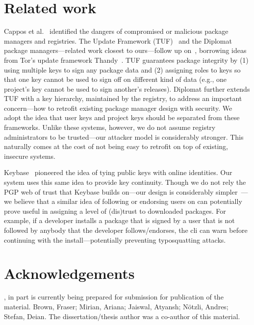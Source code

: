 \section{Related work}
\label{sec:related}

%
Cappos et al.~\cite{cappos:look} identified the dangers of compromised or
malicious package managers and registries.
%
The Update Framework (TUF)~\cite{samuel2010survivable} and the
Diplomat~\cite{kuppusamy2016diplomat} package managers---related work closest
to ours---follow up on~\cite{cappos:look}, borrowing ideas from Tor's update
framework Thandy~\cite{thandy}.
%
TUF guarantees package integrity by (1) using multiple keys to sign any package
data and (2) assigning roles to keys so that one key cannot be used to sign off
on different kind of data (e.g., one project's key cannot be used to sign
another's releases).
%
Diplomat further extends TUF with a key hierarchy, maintained by the registry,
to address an important concern---how to retrofit existing package manager
design with security.
%
We adopt the idea that user keys and project keys should be separated from
these frameworks.
%
Unlike these systems, however, we do not assume registry administrators to be
trusted---our attacker model is considerably stronger.
%
This naturally comes at the cost of not being easy to retrofit on top of
existing, insecure systems.

Keybase~\cite{keybase} pioneered the idea of tying public keys with online
identities.
%
Our system uses this same idea to provide key continuity.
%
Though we do not rely the PGP web of trust that Keybase builds on---our design
is considerably simpler~\cite{openbsd}---we believe that a similar idea of
following or endorsing users on \spam can potentially prove useful in assigning
a level of (dis)trust to downloaded packages.
%
For example, if a developer installs a package that is signed by a user that is
not followed by anybody that the developer follows/endorses, the \spam cli can
warn before continuing with the install---potentially preventing typosquatting
attacks.

\section{Acknowledgements}
\label{sec:acknowledgement-spam}
, in part is currently being prepared for submission for
publication of the material. Brown, Fraser; Mirian, Ariana; Jaiswal, Atyansh;
N\"otzli, Andres; Stefan, Deian. The dissertation/thesis author was a
co-author of this material.
